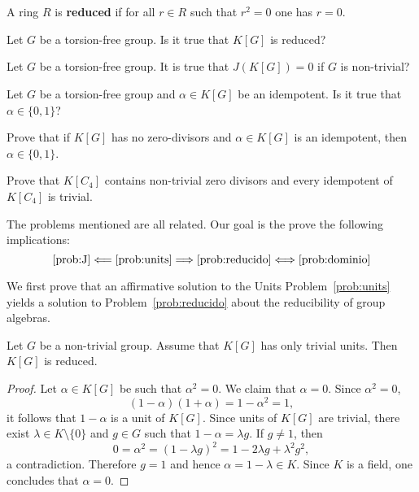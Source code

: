 \chapter{}

A ring $R$ is \textbf{reduced} if for all $r\in R$ such that 
$r^2=0$ one has $r=0$. 

\begin{problem}
	\label{prob:reducido}
	Let $G$ be a torsion-free group. Is it true that 
	$K[G]$ is reduced? 
\end{problem}

\begin{problem}[Semisimplicity]
	\label{prob:J}
	Let $G$ be a torsion-free group. It is true that 
	$J(K[G])=0$ if $G$ is non-trivial?
\end{problem}

\begin{problem}[Idempotents]
	\label{pro:idempotente}
	Let $G$ be a torsion-free group and $\alpha\in K[G]$ be an idempotent. 
	Is it true that $\alpha\in\{0,1\}$?
\end{problem}

\begin{exercise}
	Prove that if $K[G]$ has no zero-divisors and $\alpha\in K[G]$ is an
	idempotent, then $\alpha\in\{0,1\}$.
\end{exercise}

\begin{exercise}
	Prove that $K[C_4]$ contains non-trivial zero divisors and every
	idempotent of $K[C_4]$ is trivial. 
\end{exercise}

The problems mentioned are all related. Our goal is the prove
the following implications:
\[
	\ref{prob:J}\Longleftarrow\ref{prob:units}\Longrightarrow\ref{prob:reducido}\Longleftrightarrow\ref{prob:dominio}
\]

We first prove that an affirmative solution to the Units
Problem~\ref{prob:units} yields a solution to Problem~\ref{prob:reducido}
about the reducibility of group algebras.

\begin{theorem}
	Let $G$ be a non-trivial group. Assume that $K[G]$ has only trivial units.
	Then $K[G]$ is reduced. 
\end{theorem}

\begin{proof}
	Let $\alpha\in K[G]$ be such that $\alpha^2=0$. We claim that 
	$\alpha=0$. Since $\alpha^2=0$, 
	\[
		(1-\alpha)(1+\alpha)=1-\alpha^2=1, 
	\]
	it follows that $1-\alpha$ is a unit of $K[G]$. Since units of $K[G]$ are 
	trivial, there exist $\lambda\in K\setminus\{0\}$ and $g\in G$ such that 
	$1-\alpha=\lambda g$. If $g\ne 1$, then 
	\[
		0=\alpha^2=(1-\lambda g)^2=1-2\lambda g+\lambda^2g^2,
	\]
	a contradiction. Therefore $g=1$ and hence $\alpha=1-\lambda\in K$. Since
	$K$ is a field, one concludes that $\alpha=0$.
\end{proof}

